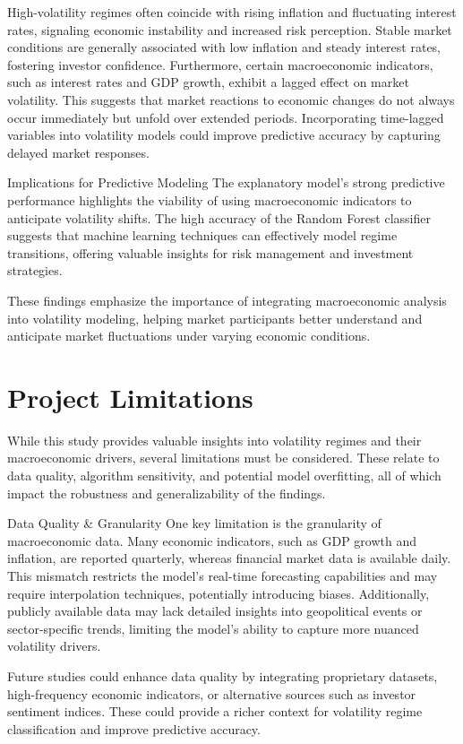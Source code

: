 High-volatility regimes often coincide with rising inflation and fluctuating interest rates, signaling economic instability and increased risk perception.
Stable market conditions are generally associated with low inflation and steady interest rates, fostering investor confidence.
Furthermore, certain macroeconomic indicators, such as interest rates and GDP growth, exhibit a lagged effect on market volatility. This suggests that market reactions to economic changes do not always occur immediately but unfold over extended periods. Incorporating time-lagged variables into volatility models could improve predictive accuracy by capturing delayed market responses.

Implications for Predictive Modeling
The explanatory model’s strong predictive performance highlights the viability of using macroeconomic indicators to anticipate volatility shifts. The high accuracy of the Random Forest classifier suggests that machine learning techniques can effectively model regime transitions, offering valuable insights for risk management and investment strategies.

These findings emphasize the importance of integrating macroeconomic analysis into volatility modeling, helping market participants better understand and anticipate market fluctuations under varying economic conditions.

\section{Project Limitations}

While this study provides valuable insights into volatility regimes and their macroeconomic drivers, several limitations must be considered. These relate to data quality, algorithm sensitivity, and potential model overfitting, all of which impact the robustness and generalizability of the findings.

Data Quality & Granularity
One key limitation is the granularity of macroeconomic data. Many economic indicators, such as GDP growth and inflation, are reported quarterly, whereas financial market data is available daily. This mismatch restricts the model's real-time forecasting capabilities and may require interpolation techniques, potentially introducing biases. Additionally, publicly available data may lack detailed insights into geopolitical events or sector-specific trends, limiting the model's ability to capture more nuanced volatility drivers.

Future studies could enhance data quality by integrating proprietary datasets, high-frequency economic indicators, or alternative sources such as investor sentiment indices. These could provide a richer context for volatility regime classification and improve predictive accuracy.

